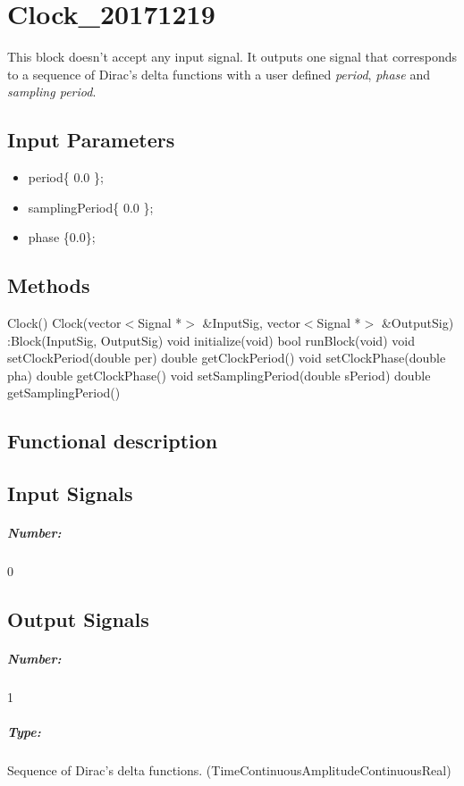 \clearpage

\section{Clock\_20171219}

This block doesn't accept any input signal. It outputs one signal that corresponds to a sequence of Dirac's delta functions with a user defined \textit{period}, \textit{phase} and \textit{sampling period}.

\subsection*{Input Parameters}

\begin{itemize}
	\item period\{ 0.0 \};
	\item samplingPeriod\{ 0.0 \};
    \item phase \{0.0\};
\end{itemize}

\subsection*{Methods}

Clock() {}
\bigbreak
Clock(vector$<$Signal *$>$ \&InputSig, vector$<$Signal *$>$ \&OutputSig) :Block(InputSig, OutputSig) {}
\bigbreak
void initialize(void)
\bigbreak
bool runBlock(void)
\bigbreak
void setClockPeriod(double per)
double getClockPeriod()
\bigbreak
void setClockPhase(double pha)
double getClockPhase()
\bigbreak
void setSamplingPeriod(double sPeriod)
double getSamplingPeriod()

\subsection*{Functional description}


\subsection*{Input Signals}

\subparagraph*{Number:} 0

\subsection*{Output Signals}

\subparagraph*{Number:} 1

\subparagraph*{Type:} Sequence of Dirac's delta functions. (TimeContinuousAmplitudeContinuousReal)

